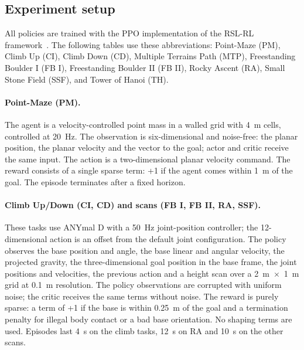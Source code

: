 
\subsection{Experiment setup}\label{sec:appendix_obs_act}
All policies are trained with the PPO implementation of the RSL-RL framework~\citep{schwarke2025rslrllearninglibraryrobotics}. The following tables use these abbreviations: Point-Maze (PM), Climb Up (CI), Climb Down (CD), Multiple Terrains Path (MTP), Freestanding Boulder I (FB I), Freestanding Boulder II (FB II), Rocky Ascent (RA), Small Stone Field (SSF), and Tower of Hanoi (TH).

\paragraph{Point-Maze (PM).}
The agent is a velocity-controlled point mass in a walled grid with \SI{4}{\meter} cells, controlled at \SI{20}{\hertz}. The observation is six-dimensional and noise-free: the planar position, the planar velocity and the vector to the goal; actor and critic receive the same input. The action is a two-dimensional planar velocity command. The reward consists of a single sparse term: +1 if the agent comes within \SI{1}{\meter} of the goal. The episode terminates after a fixed horizon.

\paragraph{Climb Up/Down (CI, CD) and scans (FB I, FB II, RA, SSF).}
These tasks use ANYmal D with a \SI{50}{\hertz} joint-position controller; the 12-dimensional action is an offset from the default joint configuration. The policy observes the base position and angle, the base linear and angular velocity, the projected gravity, the three-dimensional goal position in the base frame, the joint positions and velocities, the previous action and a height scan over a \SI{2}{\meter}~$\times$~\SI{1}{\meter} grid at \SI{0.1}{\meter} resolution. The policy observations are corrupted with uniform noise; the critic receives the same terms without noise. The reward is purely sparse: a term of +1 if the base is within \SI{0.25}{\meter} of the goal and a termination penalty for illegal body contact or a bad base orientation. No shaping terms are used. Episodes last \SI{4}{\second} on the climb tasks, \SI{12}{\second} on RA and \SI{10}{\second} on the other scans.

